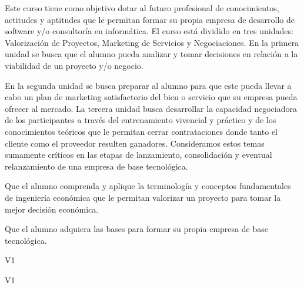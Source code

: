 \begin{syllabus}


\begin{justification}
Este curso tiene como objetivo dotar al futuro profesional de conocimientos, actitudes y aptitudes que le permitan formar su propia empresa de desarrollo de software y/o consultoría en informática. El curso está dividido en tres unidades: Valorización de Proyectos, Marketing de Servicios y Negociaciones. En la primera unidad se busca que el alumno pueda analizar y tomar decisiones en relación a la viabilidad de un proyecto y/o negocio.

En la segunda unidad se busca preparar al alumno para que este pueda llevar a cabo un plan de marketing satisfactorio del bien o servicio que su empresa pueda ofrecer al mercado. La tercera unidad busca desarrollar la capacidad negociadora de los participantes a través del entrenamiento vivencial y práctico y de los conocimientos teóricos que le permitan cerrar contrataciones donde tanto el cliente como el proveedor resulten ganadores. Consideramos estos temas sumamente críticos en las etapas de lanzamiento, consolidación y eventual relanzamiento de una empresa de base tecnológica.
\end{justification}

\begin{goals}
\item Que el alumno comprenda y aplique la terminología y conceptos fundamentales de ingeniería económica que le permitan valorizar un proyecto para tomar la mejor decisión económica.
\item Que el alumno adquiera las bases para formar su propia empresa de base tecnológica.
\end{goals}

\begin{outcomes}{V1}
    \item {}
    \item {}
    \item {}
\end{outcomes}

\begin{competences}{V1}
    \item {} 
    \item {}
    \item {}
    \item {}
    \item {}
    \item {}
    \item {}
    \item {}
\end{competences}


\end{syllabus}
